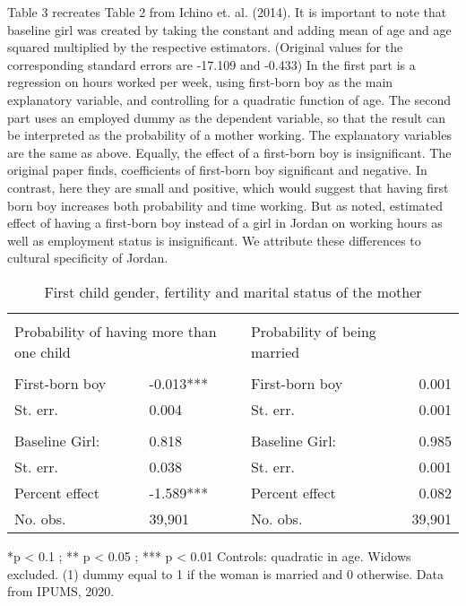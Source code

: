 \documentclass[12pt,draft,a4paper]{article}
\begin{document}
Table 3 recreates Table 2 from Ichino et. al. (2014). It is important to note that baseline girl was created by taking the constant and adding mean of age and age squared multiplied by the respective estimators. 
(Original values for the corresponding standard errors are -17.109 and -0.433) 
In the first part is a regression on hours worked per week, using first-born boy as the main explanatory variable, and controlling for a quadratic function of age. 
The second part uses an employed dummy as the dependent variable, so that the result can be interpreted as the probability of a mother working. 
The explanatory variables are the same as above. Equally, the effect of a first-born boy is insignificant.
The original paper finds, coefficients of first-born boy significant and negative. In contrast, here they are small and positive, which would suggest that having first born boy increases both probability and time working. 
But as noted, estimated effect of having a first-born boy instead of a girl in Jordan on working hours as well as employment status is insignificant. We attribute these differences to cultural specificity of Jordan.
    

\begin{table}[bp]%
    \caption{First child gender, fertility and marital status of the mother}

    
    \begin{tabularx}{\textwidth}{lXlr}
    
    \hline & \\[-1.0em]
    \multicolumn{2}{l}{Probability of having more than one child}  & Probability of being married &  \\
    \hline & \\[-1.0em]
        First-born boy & -0.013***  & First-born boy  & 0.001   \\
        St. err.       & 0.004      & St. err.        & 0.001   \\
        \\[-1.0em]                                                     
        Baseline Girl: & 0.818      & Baseline Girl:  & 0.985   \\
        St. err.       & 0.038      & St. err.        & 0.001   \\
        Percent effect & -1.589***  & Percent effect  & 0.082   \\
        No. obs.       & 39,901     & No. obs.        & 39,901 \\
    \hline
    \end{tabularx}

    *p < 0.1 ; ** p < 0.05 ; *** p < 0.01 Controls: quadratic in age. Widows excluded. (1) dummy equal to 1 if the woman is married and 0 otherwise. Data from IPUMS, 2020.
    \label{tab:fert}
    \end{table}
    
\end{document}
